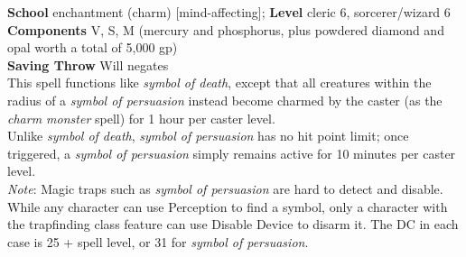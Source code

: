 \textbf{School} enchantment (charm) [mind-affecting]; \textbf{Level} cleric 6, sorcerer/wizard 6\\
\textbf{Components} V, S, M (mercury and phosphorus, plus powdered diamond and opal worth a total of 5,000 gp)\\
\textbf{Saving Throw }Will negates\\
This spell functions like \textit{symbol of death}, except that all creatures within the radius of a \textit{symbol of persuasion }instead become charmed by the caster (as the \textit{charm monster }spell) for 1 hour per caster level.\\
Unlike \textit{symbol of death}, \textit{symbol of persuasion }has no hit point limit; once triggered, a \textit{symbol of persuasion }simply remains active for 10 minutes per caster level.\\
\textit{Note}: Magic traps such as \textit{symbol of persuasion }are hard to detect and disable. While any character can use Perception to find a symbol, only a character with the trapfinding class feature can use Disable Device to disarm it. The DC in each case is 25 + spell level, or 31 for \textit{symbol of persuasion}.\\
